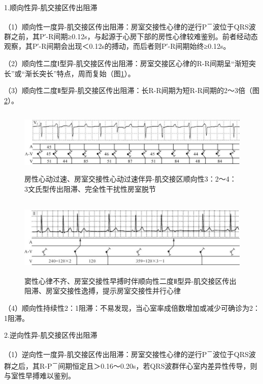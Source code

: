 1.顺向性异-肌交接区传出阻滞

（1）顺向性一度异-肌交接区传出阻滞：房室交接性心律的逆行P\textsuperscript{－}波位于QRS波群之前，其P′-R间期≥0.12s，与起源于心房下部的房性心律较难鉴别。前者经动态观察，其P′-R间期会出现＜0.12s的搏动，而后者则P′-R间期始终≥0.12s。

（2）顺向性二度Ⅰ型异-肌交接区传出阻滞：房室交接区心律的R-R间期呈“渐短突长”或“渐长突长”特点，周而复始（图\ref{fig23-6}）。

（3）顺向性二度Ⅱ型异-肌交接区传出阻滞：长R-R间期为短R-R间期的2～3倍（图\ref{fig23-7}）。

\begin{figure}[!htbp]
 \centering
 \includegraphics[width=5.8125in,height=1.20833in]{./images/Image00390.jpg}
 \captionsetup{justification=centering}
 \caption{房性心动过速、房室交接性心动过速伴异-肌交接区顺向性3：2～4：3文氏型传出阻滞、完全性干扰性房室脱节}
 \label{fig23-6}
  \end{figure} 

\begin{figure}[!htbp]
 \centering
 \includegraphics[width=5.80208in,height=1.48958in]{./images/Image00391.jpg}
 \captionsetup{justification=centering}
 \caption{窦性心律不齐、房室交接性早搏时伴顺向性二度Ⅱ型异-肌交接区传出阻滞、房室交接性逸搏，提示房室交接性并行心律}
 \label{fig23-7}
  \end{figure} 

（4）顺向性持续性2：1阻滞：不易发现，当心室率成倍数增加或减少可确诊为2：1阻滞。

2.逆向性异-肌交接区传出阻滞

（1）逆向性一度异-肌交接区传出阻滞：房室交接性心律的逆行P\textsuperscript{－}波位于QRS波群之后，其R-P\textsuperscript{－}间期恒定且＞0.16～0.20s，若QRS波群伴心室内差异性传导，则与室性早搏难以鉴别。

